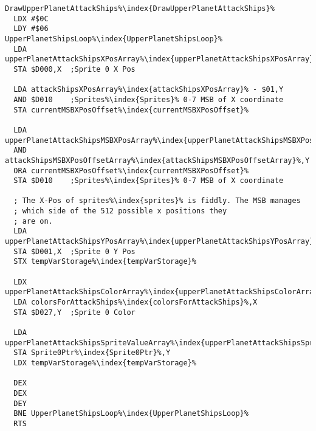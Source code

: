 \begin{minipage}[b]{0.50\linewidth}
\centering
\begin{lstlisting}[basicstyle=\tiny\ttfamily,escapechar=\%]
DrawUpperPlanetAttackShips%\index{DrawUpperPlanetAttackShips}%
  LDX #$0C
  LDY #$06
UpperPlanetShipsLoop%\index{UpperPlanetShipsLoop}%   
  LDA upperPlanetAttackShipsXPosArray%\index{upperPlanetAttackShipsXPosArray}%,Y
  STA $D000,X  ;Sprite 0 X Pos

  LDA attackShipsXPosArray%\index{attackShipsXPosArray}% - $01,Y
  AND $D010    ;Sprites%\index{Sprites}% 0-7 MSB of X coordinate
  STA currentMSBXPosOffset%\index{currentMSBXPosOffset}%

  LDA upperPlanetAttackShipsMSBXPosArray%\index{upperPlanetAttackShipsMSBXPosArray}%,Y
  AND attackShipsMSBXPosOffsetArray%\index{attackShipsMSBXPosOffsetArray}%,Y
  ORA currentMSBXPosOffset%\index{currentMSBXPosOffset}%
  STA $D010    ;Sprites%\index{Sprites}% 0-7 MSB of X coordinate

  ; The X-Pos of sprites%\index{sprites}% is fiddly. The MSB manages
  ; which side of the 512 possible x positions they
  ; are on.
  LDA upperPlanetAttackShipsYPosArray%\index{upperPlanetAttackShipsYPosArray}%,Y
  STA $D001,X  ;Sprite 0 Y Pos
  STX tempVarStorage%\index{tempVarStorage}%

  LDX upperPlanetAttackShipsColorArray%\index{upperPlanetAttackShipsColorArray}%,Y
  LDA colorsForAttackShips%\index{colorsForAttackShips}%,X
  STA $D027,Y  ;Sprite 0 Color

  LDA upperPlanetAttackShipsSpriteValueArray%\index{upperPlanetAttackShipsSpriteValueArray}%,Y
  STA Sprite0Ptr%\index{Sprite0Ptr}%,Y
  LDX tempVarStorage%\index{tempVarStorage}%

  DEX
  DEX
  DEY
  BNE UpperPlanetShipsLoop%\index{UpperPlanetShipsLoop}%
  RTS
\end{lstlisting}
\end{minipage}
\hspace{0.5cm}
